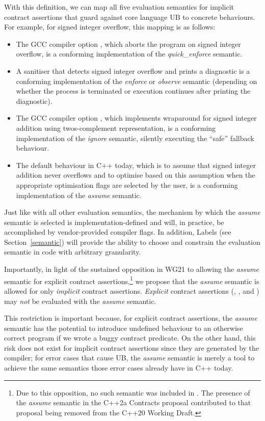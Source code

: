 {With this definition, we can map all five evaluation semantics for implicit contract assertions that guard against core language UB to concrete behaviours. For example, for signed integer overflow, this mapping is as follows:
\begin{itemize}
\item The GCC compiler option , which aborts the program on signed integer overflow, is a conforming implementation of the \emph{quick_enforce} semantic.
\item A sanitiser that detects signed integer overflow and prints a diagnostic is a conforming
implementation of the \emph{enforce} or \emph{observe} semantic (depending on whether the
process is terminated or execution continues after printing the diagnostic).
\item The GCC compiler option , which implements wraparound for signed integer addition using twos-complement representation, is a conforming implementation of the \emph{ignore} semantic,  silently executing the ``safe'' fallback behaviour.
\item The default behaviour in C++ today, which is to assume that signed integer addition never overflows and to optimise based on this assumption when the appropriate optimisation flags are selected by the user, is a conforming implementation of the \emph{assume} semantic.
\end{itemize}
Just like with all other evaluation semantics, the mechanism by which the \emph{assume} semantic is selected is implementation-defined and will, in practice, be accomplished by vendor-provided compiler flags. In addition, Labels (see Section~\ref{semantic}) will provide the ability to choose and constrain the evaluation semantic in code with arbitrary granularity.

Importantly, in light of the sustained opposition in WG21 to allowing the \emph{assume} semantic for explicit contract assertions,\footnote{Due to this opposition, no such semantic was included in \cite{P2900R14}. The presence of the \emph{assume} semantic in the C++2a Contracts proposal \cite{P0542R5} contributed to that proposal being removed from the C++20 Working Draft.} we propose that the \emph{assume} semantic is allowed for only \emph{implicit} contract assertions. \emph{Explicit} contract assertions (, , and ) may \emph{not} be evaluated with the \emph{assume} semantic.

This restriction is important because, for explicit contract assertions, the \emph{assume} semantic  has the potential to introduce undefined behaviour to an otherwise correct program if we wrote a buggy contract predicate. On the other hand, this risk does not exist for implicit contract assertions since they are generated by the compiler; for error cases that cause UB, the \emph{assume} semantic is merely a tool to achieve the same semantics those error cases already have in C++ today.

}

